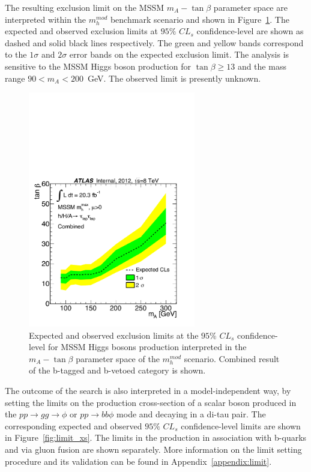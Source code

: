 The resulting exclusion limit on the MSSM $m_A - \tan\beta$ parameter space are interpreted 
within the $m_{h}^{mod}$ benchmark scenario and  shown in Figure~\ref{fig:limit_extract_combined}. 
The expected and observed exclusion limits at $95\%$ $CL_s$  confidence-level 
are shown as dashed and solid black lines respectively. The green 
and yellow bands correspond to the $1\sigma$ and $2\sigma$ error bands on the expected exclusion limit. 
The analysis is sensitive to the MSSM Higgs boson production for $\tan\beta \geq 13$ and the mass range $90<m_A<200$~GeV.
The observed limit is presently unknown. %


\begin{figure}[tp]
  \centering
  \includegraphics[width=0.65\textwidth]{figure/limits/Limits_mAtanBeta_Comb.pdf}
  \caption{Expected and observed  exclusion limits at the $95\%$ $CL_s$ confidence-level for MSSM Higgs bosons production 
   interpreted in the  $m_A - \tan\beta$ parameter space of the $m_h^{mod}$ scenario. 
	Combined result of the  b-tagged and b-vetoed category is shown.}
\label{fig:limit_extract_combined}
\end{figure}


The outcome of the search is also interpreted in a model-independent way, by setting the limits
on the production cross-section of a scalar boson produced in the
$pp \rightarrow gg \rightarrow \phi$ or $pp \rightarrow bb\phi$ mode and decaying in a di-tau pair.
The corresponding expected and observed $95\%$ $CL_s$ confidence-level  limits are shown in Figure~\ref{fig:limit_xs}.
The limits in the production in association with b-quarks and via gluon fusion are shown separately.
More information on the limit setting procedure and its validation can be found in Appendix~\ref{appendix:limit}.

